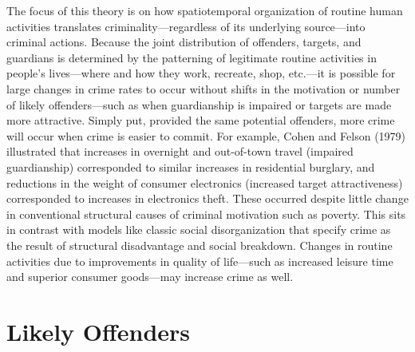 \documentclass [11pt, proquest] {uwthesis}[2015/03/03]
\begin{document}
The focus of this theory is on how spatiotemporal organization of routine human activities translates criminality---regardless of its underlying source---into criminal actions. Because the joint distribution of offenders, targets, and guardians is determined by the patterning of legitimate routine activities in people's lives---where and how they work, recreate, shop, etc.---it is possible for large changes in crime rates to occur without shifts in the motivation or number of likely offenders---such as when guardianship is impaired or targets are made more attractive. Simply put, provided the same potential offenders, more crime will occur when crime is easier to commit. For example, Cohen and Felson (1979) illustrated that increases in overnight and out-of-town travel (impaired guardianship) corresponded to similar increases in residential burglary, and reductions in the weight of consumer electronics (increased target attractiveness) corresponded to increases in electronics theft. These occurred despite little change in conventional structural causes of criminal motivation such as poverty. This sits in contrast with models like classic social disorganization that specify crime as the result of structural disadvantage and social breakdown. Changes in routine activities due to improvements in quality of life---such as increased leisure time and superior consumer goods---may increase crime as well.

\hypertarget{likely-offenders}{%
\section{Likely Offenders}\label{likely-offenders}}
\end{document}
